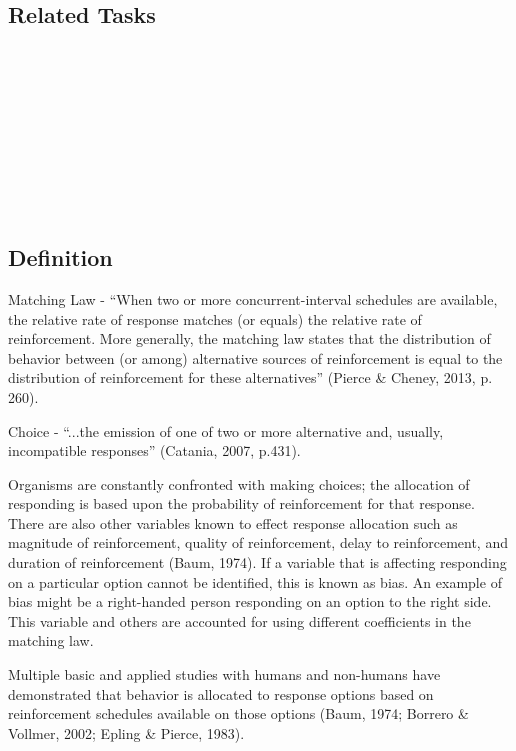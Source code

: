 \subsection{Related Tasks}
\fourcTwo{}\\
\fourdFifteen{}\\
\fourdSixteen{}\\
\fourdSeventeen{}\\
\fourjTen{}\\
\fourkTwo{}\\
\fourFKThirtyEight{}\\
\fourFKFourty{}\\
%
%
%
%
%
%
%
%
%
\section[\foureEight{}]{\foureEight{}%
              }
\subsection{Definition} 
Matching Law - ``When two or more concurrent-interval schedules are available, the relative rate of response matches (or equals) the relative rate of reinforcement. More generally, the matching law states that the distribution of behavior between (or among) alternative sources of reinforcement is equal to the distribution of reinforcement for these alternatives'' (Pierce \& Cheney, 2013, p. 260).

Choice - ``...the emission of one of two or more alternative and, usually, incompatible responses'' (Catania, 2007, p.431).

Organisms are constantly confronted with making choices; the allocation of responding is based upon the probability of reinforcement for that response. There are also other variables known to effect response allocation such as magnitude of reinforcement, quality of reinforcement, delay to reinforcement, and duration of reinforcement (Baum, 1974). If a variable that is affecting responding on a particular option cannot be identified, this is known as bias. An example of bias might be a right-handed person responding on an option to the right side. This variable and others are accounted for using different coefficients in the matching law.

Multiple basic and applied studies with humans and non-humans have demonstrated that behavior is allocated to response options based on reinforcement schedules available on those options (Baum, 1974; Borrero \& Vollmer, 2002; Epling \& Pierce, 1983).

